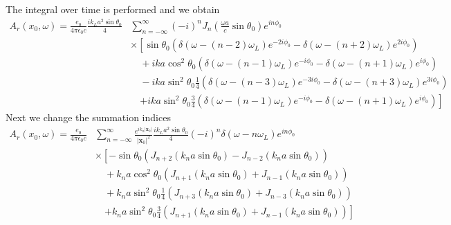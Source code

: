 The integral over time is performed and we obtain
\begin{align}
    A_r(x_0,\omega)=\frac{e_0 }{4\pi\epsilon_0 c} \frac{ik_La^2\sin\theta_0}4 & \sum_{n=-\infty}^{\infty} (-i)^n J_n(\frac{\omega a}c\sin\theta_0)e^{in\phi_0}\nonumber                                                    \\
                                                                              & \times\left[{\sin\theta_0}\left(\delta(\omega-(n-2)\omega_L)e^{-2i\phi_0}-\delta(\omega-(n+2)\omega_L)e^{2i\phi_0}\right)\right.\nonumber  \\
                                                                              & \quad +{ika}\cos^2\theta_0\left(\delta(\omega-(n-1)\omega_L)e^{-i\phi_0}-\delta(\omega-(n+1)\omega_L)e^{i\phi_0}\right)\nonumber           \\
                                                                              & \quad-ika\sin^2\theta_0\frac1{4}\left(\delta(\omega-(n-3)\omega_L)e^{-3i\phi_0}-\delta(\omega-(n+3)\omega_L)e^{3i\phi_0}\right)  \nonumber \\
                                                                              & \quad\left.+ika\sin^2\theta_0\frac3{4}\left(\delta(\omega-(n-1)\omega_L)e^{-i\phi_0}-\delta(\omega-(n+1)\omega_L)e^{i\phi_0}\right)\right]
\end{align}
Next we change the summation indices
\begin{align}
    A_r(x_0,\omega)=\frac{e_0 }{4\pi\epsilon_0 c} & \sum_{n=-\infty}^{\infty}\frac{e^{i k_n|{\bm x}_0|}}{|{\bm x}_0|^2}\frac{ik_La^2\sin\theta_0}4 (-i)^n \delta(\omega-n\omega_L)e^{in\phi_0}\nonumber \\
                                                  & \times\left[-\sin\theta_0\left(J_{n+2}(k_na\sin\theta_0)-J_{n-2}(k_na\sin\theta_0)\right)\right.\nonumber                                           \\
                                                  & \quad +{k_na}\cos^2\theta_0\left(J_{n+1}(k_na\sin\theta_0)+J_{n-1}(k_na\sin\theta_0)\right)\nonumber                                                \\
                                                  & \quad+k_na\sin^2\theta_0\frac1{4}\left(J_{n+3}(k_na\sin\theta_0)+J_{n-3}(k_na\sin\theta_0)\right)\nonumber                                          \\
                                                  & \quad\left.+k_na\sin^2\theta_0\frac3{4}\left(J_{n+1}(k_na\sin\theta_0)+J_{n-1}(k_na\sin\theta_0)\right)\right]
\end{align}

